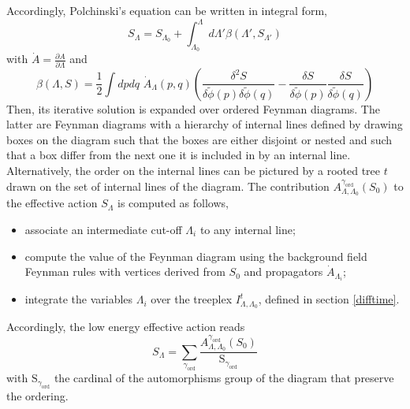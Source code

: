 \documentclass[12pt,here,feynmf]{article}
\begin{document}
Accordingly, Polchinski's equation can be written in integral form,
\begin{equation}
S_{\Lambda}=S_{\Lambda_{0}}+\int_{\Lambda_{0}}^{\Lambda}d\Lambda'
\beta(\Lambda',S_{\Lambda'})
\end{equation}
with $\dot{A}=\frac{\partial A}{\partial \Lambda}$ and
\begin{equation}
\beta(\Lambda,S)
=\frac{1}{2}
\int\!dpdq\,\,  \dot{A}_{\Lambda}(p,q)
\left(
\frac{\delta^{2}S}{\delta\widetilde{\phi}(p)\delta\widetilde{\phi}(q)}
- \frac{\delta S}{\delta\widetilde{\phi}(p)} \frac{\delta S}{\delta\widetilde{\phi}(q)} \right)
\end{equation}
Then, its iterative solution is expanded over ordered Feynman diagrams. The latter are Feynman diagrams with a hierarchy of internal lines defined by drawing boxes on the diagram such that the boxes are either disjoint or nested and such that a box differ from the next one it is included in by an internal line. Alternatively, the order on the internal lines can be pictured by a rooted tree $t$ drawn on the set of internal lines of the diagram. The contribution $A_{\Lambda,\Lambda_{0}}^{\gamma_{\mathrm{ord}}}(S_{0})$ to the effective action $S_{\Lambda}$ is computed as follows,
\begin{itemize}
\item
associate an intermediate cut-off $\Lambda_{i}$ to any internal line;
\item
compute the value of the Feynman diagram using the background field Feynman rules with vertices derived from $S_{0}$ and propagators $\dot{A}_{\Lambda_{i}}$;
\item
integrate the variables $\Lambda_{i}$ over the treeplex $I_{\Lambda,\Lambda_{0}}^{t}$, defined in section \ref{difftime}.
\end{itemize}
Accordingly, the low energy effective action reads
\begin{equation}
S_{\Lambda}=\sum_{\gamma_{\mathrm{ord}}}\frac{A_{\Lambda,\Lambda_{0}}^{\gamma_{\mathrm{ord}}}(S_{0})}{\mathrm{S}_{\gamma_{\mathrm{ord}}}}
\end{equation}
with $\mathrm{S}_{\gamma_{\mathrm{ord}}}$ the cardinal of the automorphisms  group of the diagram that preserve the ordering.
\end{document}
